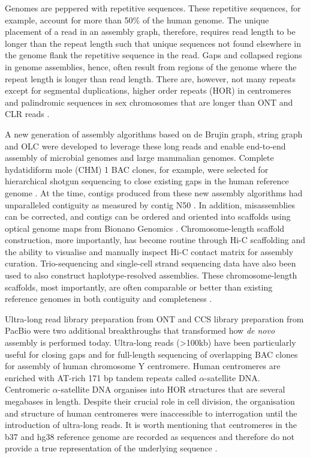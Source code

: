 Genomes are peppered with repetitive sequences. These repetitive sequences, for example, account for more than 50\% of the human genome\cite{Lander2001-du}. The unique placement of a read in an assembly graph, therefore, requires read length to be longer than the repeat length such that unique sequences not found elsewhere in the genome flank the repetitive sequence in the read. Gaps and collapsed regions in genome assemblies, hence, often result from regions of the genome where the repeat length is longer than read length. There are, however, not many repeats except for segmental duplications\cite{Bailey2002-xn}, higher order repeats (HOR) in centromeres\cite{Willard1985-bo} and palindromic sequences in sex chromosomes that are longer than ONT and CLR reads \cite{Skaletsky2003-sr}. 

A new generation of assembly algorithms based on de Brujin graph\cite{Lin2016-vl}, string graph\cite{Myers2005-ei, Chin2016-at} and OLC\cite{Koren2017-cq} were developed to leverage these long reads and enable end-to-end assembly of microbial genomes\cite{Bashir2012-cs, Chin2013-hp} and large mammalian genomes\cite{Chin2016-at, Koren2017-cq}. Complete hydatidiform mole (CHM) 1 BAC clones, for example, were selected for hierarchical shotgun sequencing to close existing gaps in the human reference genome \cite{Huddleston2014-rs}. At the time, contigs produced from these new assembly algorithms had unparalleled contiguity as measured by contig N50 \cite{}. In addition, misassemblies can be corrected, and contigs can be ordered and oriented into scaffolds using optical genome maps from Bionano Genomics \cite{Pendleton2015-ue}. Chromosome-length scaffold construction, more importantly, has become routine through Hi-C scaffolding\cite{Dudchenko2017-kb} and the ability to visualise\cite{Robinson2018-os} and manually inspect Hi-C contact matrix for assembly curation\cite{Dudchenko2018-yl}. Trio-sequencing\cite{Koren2018-wg} and single-cell strand sequencing data\cite{Porubsky2021-ct} have also been used to also construct haplotype-resolved assemblies. These chromosome-length scaffolds, most importantly, are often comparable or better than existing reference genomes in both contiguity and completeness \cite{Matthews2018-tv}. 

Ultra-long read library preparation from ONT and CCS library preparation from PacBio were two additional breakthroughs that transformed how \textit{de novo} assembly is performed today. Ultra-long reads (>100kb) have been particularly useful for closing gaps\cite{Jain2018-zh} and for full-length sequencing of overlapping BAC clones for assembly of human chromosome Y centromere\cite{Jain2018-mg}. Human centromeres are enriched with AT-rich 171 bp tandem repeats called $\alpha$-satellite DNA. Centromeric $\alpha$-satellite DNA organises into HOR structures that are several megabases in length. Despite their crucial role in cell division, the organisation and structure of human centromeres were inaccessible to interrogation until the introduction of ultra-long reads. It is worth mentioning that centromeres in the b37 and hg38 reference genome are recorded as sequences and therefore do not provide a true representation of the underlying sequence \cite{Miga2014-uv}.


